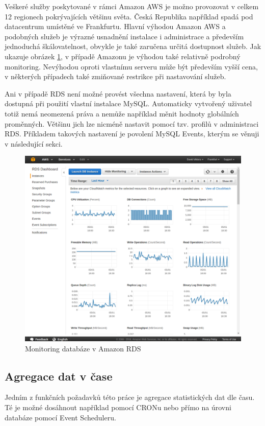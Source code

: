 \documentclass[thesis=B,czech]{FITthesis}[2012/06/26]
\begin{document}
	Veškeré služby poskytované v rámci Amazon AWS je možno provozovat v celkem 12 regionech pokrývajících většinu světa. Česká Republika například spadá pod datacentrum umístěné ve Frankfurtu. Hlavní výhodou Amazon AWS a podobných služeb je výrazné usnadnění instalace i administrace a především jednoduchá škálovatelnost, obvykle je také zaručena určitá dostupnost služeb. Jak ukazuje obrázek \ref{fig:aws_monitoring}, v případě Amazonu je výhodou také relativně podrobný monitoring. Nevýhodou oproti vlastnímu serveru může být především vyšší cena, v některých případech také zmiňované restrikce při nastavování služeb. 
	
	Ani v případě RDS není možné provést všechna nastavení, která by byla dostupná při použití vlastní instalace MySQL. Automaticky vytvořený uživatel totiž nemá neomezená práva a nemůže například měnit hodnoty globálních proměnných. Většinu jich lze nicméně nastavit pomocí tzv. profilů v administraci RDS. Příkladem takových nastavení je povolení MySQL Events, kterým se věnuji v následující sekci. 

\begin{figure}[h]
   	\centering
   	\includegraphics[width=1\textwidth]{images/aws-monitoring.png}
   	\caption{Monitoring databáze v Amazon RDS}
   	\label{fig:aws_monitoring}
\end{figure}
	
\subsection{Agregace dat v čase}
\label{agregace-dat}
	Jedním z funkčních požadavků této práce je agregace statistických dat dle času. Té je možné dosáhnout například pomocí CRONu nebo přímo na úrovni databáze pomocí Event Scheduleru. 
	
\end{document}
